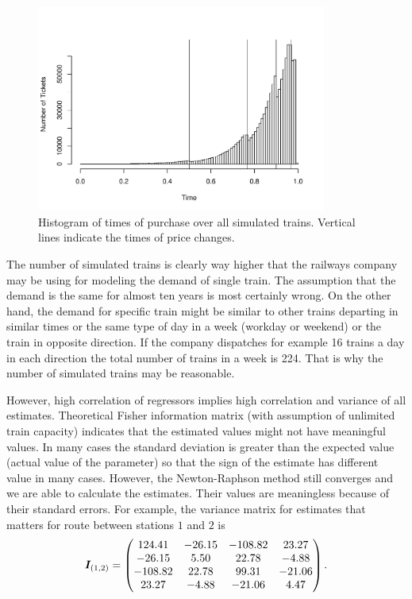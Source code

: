 \begin{figure}[t]
	\centering
	\includegraphics[width=0.85\textwidth]{figures/histTimes.pdf}
	\caption{Histogram of times of purchase over all simulated trains. Vertical lines indicate the times of price changes.}
	\label{fig:histTimes}
\end{figure}

% 


The number of simulated trains is clearly way higher that the railways company may be using for modeling the demand of single train. The assumption that the demand is the same for almost ten years is most certainly wrong. On the other hand, the demand for specific train might be similar to other trains departing in similar times or the same type of day in a week (workday or weekend) or the train in opposite direction. If the company dispatches for example 16 trains a day in each direction the total number of trains in a week is 224. That is why the number of simulated trains may be reasonable.

However, high correlation of regressors implies high correlation and variance of all estimates. Theoretical Fisher information matrix (with assumption of unlimited train capacity) indicates that the estimated values might not have meaningful values. In many cases the standard deviation is greater than the expected value (actual value of the parameter) so that the sign of the estimate has different value in many cases. However, the Newton-Raphson method still converges and we are able to calculate the estimates. Their values are meaningless because of their standard errors. For example, the variance matrix for estimates that matters for route between stations $1$ and $2$ is
\[
	\bm{I}_{(1,2)} =
	\begin{pmatrix}
	124.41 & -26.15 & -108.82 & 23.27 \\ 
  -26.15 & 5.50 & 22.78 & -4.88 \\ 
  -108.82 & 22.78 & 99.31 & -21.06 \\ 
  23.27 & -4.88 & -21.06 & 4.47 \\ 
	\end{pmatrix}.
\]

